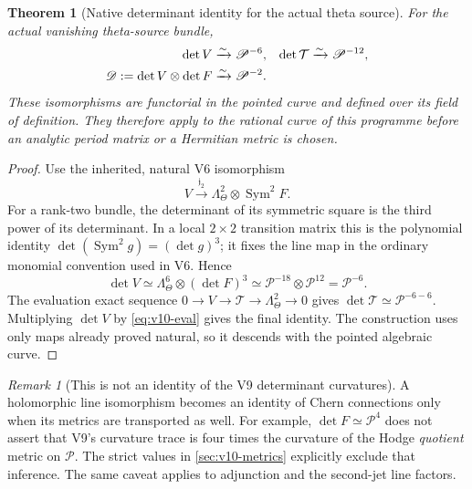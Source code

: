 \documentclass[11pt]{article}
\newtheorem{theorem}{Theorem}[section]
\theoremstyle{definition}
\theoremstyle{remark}
\newtheorem{remark}[remark]{Remark}
\begin{document}
\begin{theorem}[Native determinant identity for the actual theta source]
\label{thm:v10-line}
For the actual vanishing theta-source bundle,
\begin{align}
 \det V&\xrightarrow{\sim}\mathscr P^{-6},&
 \det\mathcal T&\xrightarrow{\sim}\mathscr P^{-12},\notag\\
 \mathscr D:=\det V\otimes\det F
   &\xrightarrow{\sim}\mathscr P^{-2}.&&
 \label{eq:v10-det}
\end{align}
These isomorphisms are functorial in the pointed curve and defined over its
field of definition. They therefore apply to the rational curve of this
programme before an analytic period matrix or a Hermitian metric is chosen.
\end{theorem}
\begin{proof}
Use the inherited, natural V6 isomorphism
\[
 V\xrightarrow{\mathfrak j_2}
 \Lambda_\Theta^2\otimes\operatorname{Sym}^2F.
\]
For a rank-two bundle, the determinant of its symmetric square is the
third power of its determinant. In a local $2\times2$ transition matrix
this is the polynomial identity
$\det(\operatorname{Sym}^2g)=(\det g)^3$; it fixes the line map in the
ordinary monomial convention used in V6. Hence
\[
 \det V\simeq\Lambda_\Theta^6\otimes(\det F)^3
 \simeq\mathscr P^{-18}\otimes\mathscr P^{12}
 =\mathscr P^{-6}.
\]
The evaluation exact sequence
$0\to V\to\mathcal T\to\Lambda_\Theta^2\to0$
gives $\det\mathcal T\simeq\mathscr P^{-6-6}$.
Multiplying $\det V$ by \cref{eq:v10-eval} gives the final identity.
The construction uses only maps already proved natural, so it descends
with the pointed algebraic curve.
\end{proof}

\begin{remark}[This is not an identity of the V9 determinant curvatures]
A holomorphic line isomorphism becomes an identity of Chern connections
only when its metrics are transported as well. For example,
$\det F\simeq\mathscr P^4$ does not assert that V9's curvature trace
is four times the curvature of the Hodge \emph{quotient} metric on
$\mathscr P$. The strict values in \cref{sec:v10-metrics} explicitly
exclude that inference. The same caveat applies to adjunction and the
second-jet line factors.
\end{remark}
\end{document}
